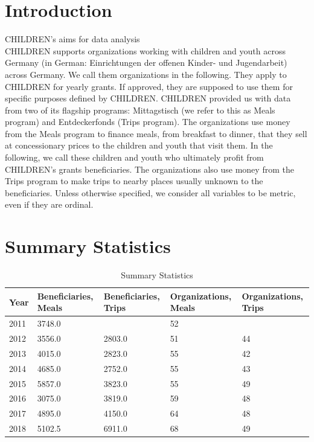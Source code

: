 \documentclass[12pt, a4paper]{article}\usepackage[]{graphicx}\usepackage[]{color}
\begin{document}
\section{Introduction}

CHILDREN's aims for data analysis\\ 
CHILDREN supports organizations working with children and youth across Germany (in German: Einrichtungen der offenen Kinder- und Jugendarbeit) across Germany. We call them organizations in the following. They apply to CHILDREN for yearly grants. If approved, they are supposed to use them for specific purposes defined by CHILDREN. CHILDREN provided us with data from two of its flagship programs: Mittagstisch (we refer to this as Meals program) and Entdeckerfonds (Trips program). The organizations use money from the Meals program to finance meals, from breakfast to dinner, that they sell at concessionary prices to the children and youth that visit them. In the following, we call these children and youth who ultimately profit from CHILDREN's grants beneficiaries. The organizations also use money from the Trips program to make trips to nearby places usually unknown to the beneficiaries.  
Unless otherwise specified, we consider all variables to be metric, even if they are ordinal. 

\section{Summary Statistics}

\begin{table}[ht]
\centering
\begin{tabular}{mmmmm}
  \hline
Year & Beneficiaries, Meals & Beneficiaries, Trips & Organizations, Meals & Organizations, Trips \\ 
  \hline
2011 & 3748.0 &  & 52 &  \\ 
  2012 & 3556.0 & 2803.0 & 51 & 44 \\ 
  2013 & 4015.0 & 2823.0 & 55 & 42 \\ 
  2014 & 4685.0 & 2752.0 & 55 & 43 \\ 
  2015 & 5857.0 & 3823.0 & 55 & 49 \\ 
  2016 & 3075.0 & 3819.0 & 59 & 48 \\ 
  2017 & 4895.0 & 4150.0 & 64 & 48 \\ 
  2018 & 5102.5 & 6911.0 & 68 & 49 \\ 
   \hline
\end{tabular}
\caption{Summary Statistics} 
\end{table}
\end{document}
